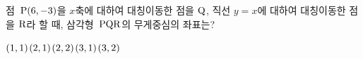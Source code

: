 점~$\mathrm{P}(6{,}\mkern3mu\mathopen{}-3)$을 $x$축에 대하여 대칭이동한 점을 $\mathrm{Q}$, 직선 $y=x$에 대하여 대칭이동한 점을 $\mathrm{R}$라 할 때, 삼각형~$\mathrm{PQR}$의 무게중심의 좌표는?
\begin{choices32}{$(1{,}\mkern3mu\mathopen{}1)$}{$(2{,}\mkern3mu\mathopen{}1)$}{$(2{,}\mkern3mu\mathopen{}2)$}{$(3{,}\mkern3mu\mathopen{}1)$}{$(3{,}\mkern3mu\mathopen{}2)$}\end{choices32}
